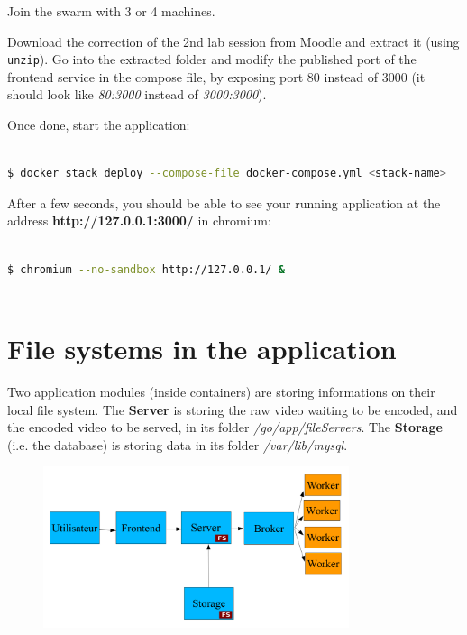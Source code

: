 \documentclass[a4paper,11pt]{exam}
\begin{document}
Join the swarm with 3 or 4 machines.

Download the correction of the 2nd lab session from Moodle and extract it (using \texttt{unzip}). 
Go into the extracted folder and modify the published port of the frontend service in the compose file, by exposing port 80 instead of 3000 (it should look like \textit{80:3000} instead of \textit{3000:3000}).

Once done, start the application:

\begin{lstlisting}[frame=single,language={sh}]  % Start your code-block

$ docker stack deploy --compose-file docker-compose.yml <stack-name>

\end{lstlisting}

After a few seconds, you should be able to see your running application at the address \textbf{http://127.0.0.1:3000/} in chromium:

\begin{lstlisting}[frame=single,language={sh}]  % Start your code-block

$ chromium --no-sandbox http://127.0.0.1/ &
		
\end{lstlisting}

\clearpage

\section{File systems in the application}

Two application modules (inside containers) are storing informations on their local file system. 
The \textbf{Server} is storing the raw video waiting to be encoded, and the encoded video to be served, in its folder \textit{/go/app/fileServers}. 
The \textbf{Storage} (i.e. the database) is storing data in its folder \textit{/var/lib/mysql}. 

\begin{figure}[!ht]
	\centering
	\includegraphics[width=0.8\textwidth]{fig/architecture.png}
	\label{fig:architecture}
\end{figure}
\end{document}
